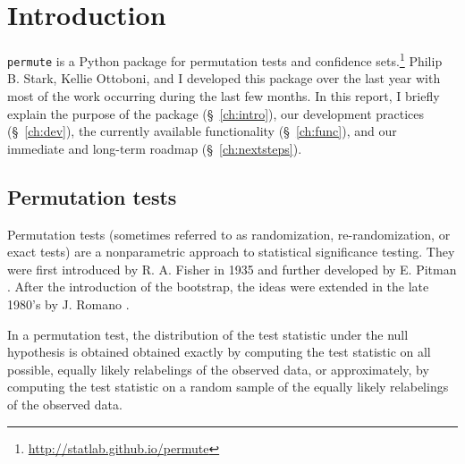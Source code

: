 \chapter{\label{ch:intro}Introduction}

\texttt{permute} is a Python package for permutation tests and confidence
sets.\footnote{\url{http://statlab.github.io/permute}}
Philip B. Stark, Kellie Ottoboni, and I developed this package over the
last year with most of the work occurring during the last few months.
In this report, I briefly explain the purpose of the package (\S~\ref{ch:intro}), our
development practices (\S~\ref{ch:dev}), the currently available functionality (\S~\ref{ch:func}), and
our immediate and long-term roadmap (\S~\ref{ch:nextsteps}).

\section{Permutation tests}

Permutation tests (sometimes referred to as randomization, re-randomization, or
exact tests) are a nonparametric approach to statistical significance testing.
They were first introduced by R. A. Fisher in 1935 \cite{fisher1935design} and
further developed by E.  Pitman  \cite{pitman1937, pitman1938significance}.
After the introduction of the bootstrap, the ideas were extended in the late
1980's by J. Romano \cite{romano1988bootstrap, romano1989bootstrap}.

In a permutation test, the distribution of the test statistic under the null
hypothesis is obtained obtained exactly by computing the test statistic on all
possible, equally likely relabelings of the observed data, or approximately, by
computing the test statistic on a random sample of the equally likely
relabelings of the observed data.


